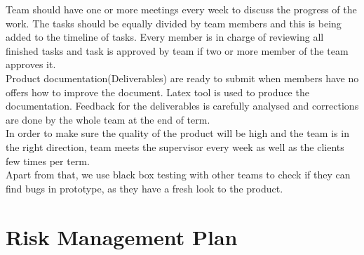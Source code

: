 \documentclass{l3deliverable}
\begin{document}
{Team should have one or more meetings every week to discuss the progress of the work. The tasks should be equally divided by team members and this is being added to the timeline of tasks. Every member is in charge of reviewing all finished tasks and task is approved by team if two or more member of the team approves it. \\

Product documentation(Deliverables) are ready to submit when members have no offers how to improve the document. Latex tool is used to produce the documentation.  Feedback for the deliverables is carefully analysed and corrections are done by the whole team at the end of term.\\

In order to make sure the quality of the product will be high and the team is in the right direction, team meets the supervisor every week as well as the clients few times per term.\\

Apart from that, we use black box testing with other teams to check if they can find bugs in prototype, as they have a fresh look to the product.\\


\section{Risk Management Plan}

}
\end{document}
